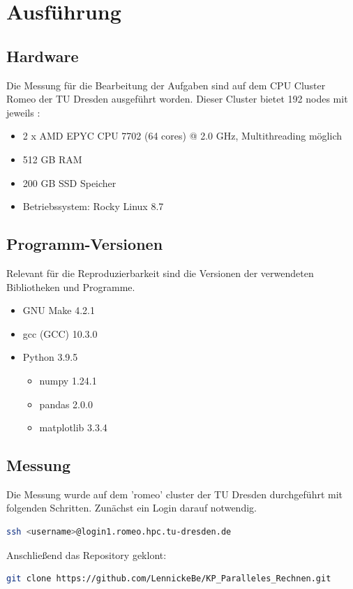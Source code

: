 \documentclass[plainarticle,zihtitle,german,final,hyperref,utf8]{zihpub}
\begin{document}
\section{Ausführung}
\subsection{Hardware}
Die Messung für die Bearbeitung der Aufgaben sind auf dem CPU Cluster Romeo der TU Dresden ausgeführt worden. Dieser Cluster bietet 192 nodes mit jeweils \cite{hpc_compendium}:
\begin{itemize}
\item 2 x AMD EPYC CPU 7702 (64 cores) @ 2.0 GHz, Multithreading möglich
\item 512 GB RAM
\item 200 GB SSD Speicher
\item Betriebssystem: Rocky Linux 8.7
\end{itemize}


\subsection{Programm-Versionen}
Relevant für die Reproduzierbarkeit sind die Versionen der verwendeten Bibliotheken und Programme.
\begin{itemize}
	\item GNU Make 4.2.1
	\item gcc (GCC) 10.3.0
	\item Python 3.9.5
	\begin{itemize}
		\item numpy 1.24.1
		\item pandas 2.0.0
		\item matplotlib 3.3.4
	\end{itemize}
\end{itemize}

\subsection{Messung}
Die Messung wurde auf dem 'romeo' cluster der TU Dresden durchgeführt mit folgenden Schritten.
Zunächst ein Login darauf notwendig.

\begin{lstlisting}[language=bash]
ssh <username>@login1.romeo.hpc.tu-dresden.de
\end{lstlisting}

Anschließend das Repository geklont:
\begin{lstlisting}[language=bash]
git clone https://github.com/LennickeBe/KP_Paralleles_Rechnen.git
\end{lstlisting}
\end{document}
